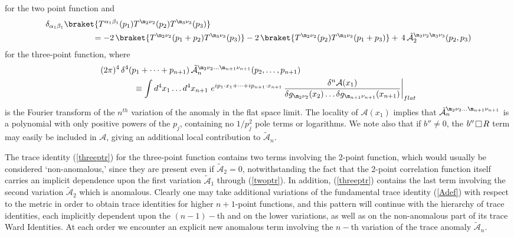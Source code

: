 \documentclass[a4paper,11pt,openright,twoside]{book}
\let\a=\alpha   \let\b=\beta   \let\g=\gamma   \let\d=\delta
\let\n=\nu      \let\x=\xi     \let\p=\pi      \let\r=\rho
\def\nbox#1#2{\vcenter{\hrule \hbox{\vrule height#2in
			\kern#1in \vrule} \hrule}}
\def\sq{\,\raise.5pt\hbox{$\nbox{.09}{.09}$}\,}
\numberwithin{equation}{section}
\begin{document}
{{{{	for the two point function and 
	\begin{align}
		&\d_{\a_1\b_1}\braket{T^{\a_1\b_1}(p_1)T^{\m_2\n_2}(p_2)T^{\m_3\n_3}(p_3)}\notag\\
		&\hspace{2cm}= - 2\,\braket{T^{\m_2\n_2}(p_1+p_2)T^{\m_3\n_3}(p_3)} -2\, \braket{T^{\m_2\n_2}(p_2)T^{\m_3\n_3}(p_1 + p_3) }
		+ \, 4 \, \tilde {\mathcal{A}}_2^{\m_2\n_2\m_3\n_3} (p_2,p_3)
		\label{threeptr}
	\end{align}
	for the three-point function, where 
	\begin{align}
		&(2\pi)^4 \,\d^4 (p_1+ \dots + p_{n+1})\, \tilde{ \mathcal{A}}_{n}^{\m_2\n_2\dots\m_{n+1}\n_{n+1}}(p_2,\dots ,p_{n+1}) \notag\\
		& \left.\qquad\qquad \equiv \int d^4x_1\dots d^4x_{n+1} \ e^{i p_1\cdot x_1 + \dots + i p_{n+1}\cdot x_{n+1}} \, 
		\frac{\d^{n}\mathcal{A}(x_1)}{\d g_{\m_2\n_2}(x_2)\dots \d g_{\m_{n+1}\n_{n+1}}(x_{n+1})}\right|_{flat}
		\label{Avardef}
	\end{align}
	is the Fourier transform of the $n^{th}$ variation of the anomaly in the flat space limit.} The locality of $\mathcal{A}(x_1)$ implies 
that $\tilde{\mathcal{A}}_{n}^{\m_2\n_2\dots\m_{n+1}\n_{n+1}}$ is a polynomial with only positive powers of the $p_j$, containing no 
$1/p_j^2$ pole terms or logarithms. We note also that if $b'' \neq 0$, the $b'' \sq R$ term may easily be included in $\mathcal{A}$, 
giving an additional local contribution to $\tilde {\mathcal{A}}_{n}$.

The trace identity (\ref{threeptr}) for the three-point function contains two terms involving the 2-point function, which would
usually be considered `non-anomalous,' since they are present even if $\tilde {\mathcal{A}}_2 =0$, notwithstanding the fact that the 2-point correlation function
itself carries an implicit dependence upon the first variation $\tilde{ \mathcal{A}}_1$ through (\ref{twoptr}). In addition, (\ref{threeptr}) contains the  
last term involving the second variation $\tilde {\mathcal{A}}_2$ which is anomalous. Clearly one may take additional variations of the fundamental trace identity 
(\ref{Adef}) with respect to the metric in order to obtain trace identities for higher $n+1$-point functions, and this pattern will continue 
with the hierarchy of trace identities, each implicitly dependent upon the $(n-1)-${th} and on the lower variations, as well as on the non-anomalous part of its trace Ward Identities. At each order we encounter an explicit new anomalous 
term involving the $n-${th} variation of the trace anomaly $\tilde {\mathcal{A}}_n$.


}}}
\end{document}
